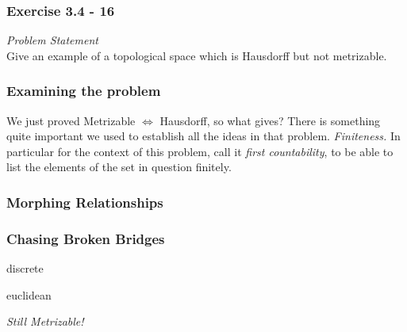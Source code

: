 
\begin{frame}
    \frametitle{Exercise 3.4 - 16}
    \textit{Problem Statement}\\
    Give an example of a topological space which is Hausdorff but not
    metrizable.
\end{frame}

\begin{frame}
    \frametitle{Examining the problem}

    We just proved Metrizable \(\Leftrightarrow\) Hausdorff, so what gives?
    \pause
    There is something quite important we used to establish all the ideas in
    that problem. 
    \pause
    \emph{Finiteness.} \pause In particular for the context of this problem,
    call it \emph{first countability}\pause, to be able to list the elements of
    the set in question finitely. %

\end{frame}

\begin{frame}
    \frametitle{Morphing Relationships}
    \centering

\end{frame}

\begin{frame}
    \frametitle{Chasing Broken Bridges}

    discrete

    euclidean

    \begin{center}
        \emph{Still Metrizable!}
    \end{center}

\end{frame}

